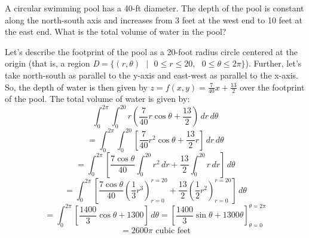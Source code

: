 \begin{Exercise}[title = {The volume of a pool}, label = polarmulti2]
A circular swimming pool has a 40-ft diameter. The depth of the pool is 
constant along the north-south axis and increases from 3 feet at the west end 
to 10 feet at the east end. What is the total volume of water in the pool? 
\vspace{50mm}
\end{Exercise}

\begin{Answer}[ref = polarmulti2]
Let's describe the footprint of the pool as a 20-foot radius circle centered 
at the origin (that is, a region \textit{D}$ = \{(r, \theta)\text{ }|\text{ }0 
\leq r \leq 20,\text{ }0 \leq \theta \leq 2\pi\}$). Further, let's take 
north-south as parallel to the y-axis and east-west as parallel to the x-axis. 
So, the depth of water is then given by $z = f(x, y) = \frac{7}{40}x + \frac{
13}{2}$ over the footprint of the pool. The total volume of water is given 
by:
$$\int_0^{2\pi} \int_0^{20} r \left( \frac{7}{40}r\cos{\theta} + \frac{13}{2} 
\right)\,dr\,d\theta$$
$$= \int_0^{2\pi} \int_0^{20} \left[ \frac{7}{40}r^2\cos{\theta} + \frac{13}{2}
r \right] \,dr\,d\theta$$
$$= \int_0^{2\pi} \left[ \frac{7\cos{\theta}}{40}\int_0^{20} r^2\,dr + \frac{13
}{2} \int_0^{20} r\,dr \right]\,d\theta$$
$$= \int_0^{2\pi} \left[ \frac{7\cos{\theta}}{40} \left( \frac{1}{3}r^3 \right)
_{r = 0}^{r = 20} + \frac{13}{2} \left( \frac{1}{2}r^2 \right)_{r = 0}^{r = 20}
\right]\,d\theta$$
$$= \int_0^{2\pi} \left[ \frac{1400}{3}\cos{\theta} + 1300 \right]\,d\theta = 
\left[ \frac{1400}{3}\sin{\theta} + 1300\theta \right]_{\theta = 0}^{\theta = 
2\pi}$$
$$= 2600\pi \text{ cubic feet}$$    
\end{Answer}
